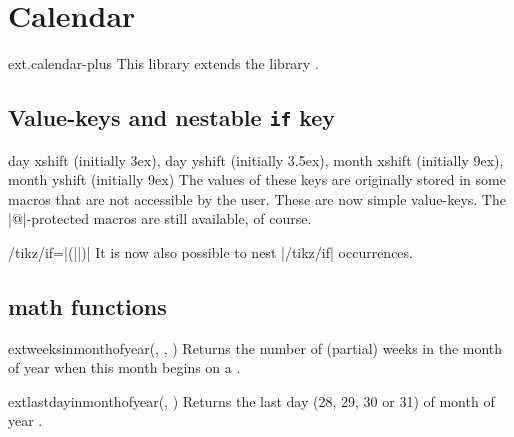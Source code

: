 %
%
%

\section{Calendar}
\begin{tikzlibrary}{ext.calendar-plus}
  This library extends the \tikzname\space library .
\end{tikzlibrary}

\begin{multicols}{2}

\subsection{Value-keys and nestable \texttt{if} key}
\begin{keylist}[/tikz]{%
  day xshift (initially 3ex),
  day yshift (initially 3.5ex),
  month xshift (initially 9ex),
  month yshift (initially 9ex)}
The values of these keys are originally stored in some macros that are not
accessible by the user. These are now simple value-keys.
The |@|-protected macros are still available, of course.
\end{keylist}

\begin{key}{/tikz/if=|(||)|}
  It is now also possible to nest |/tikz/if| occurrences.
\end{key}

\subsection{\pgfname math functions}
\begin{math-function}{ext\textunderscore weeksinmonthofyear(, , )}
  Returns the number of (partial) weeks in the month  of year 
  when this month begins on a .
\end{math-function}
\begin{math-function}{ext\textunderscore lastdayinmonthofyear(, )}
  Returns the last day (28, 29, 30 or 31) of month  of year .
\end{math-function}


\end{multicols}
